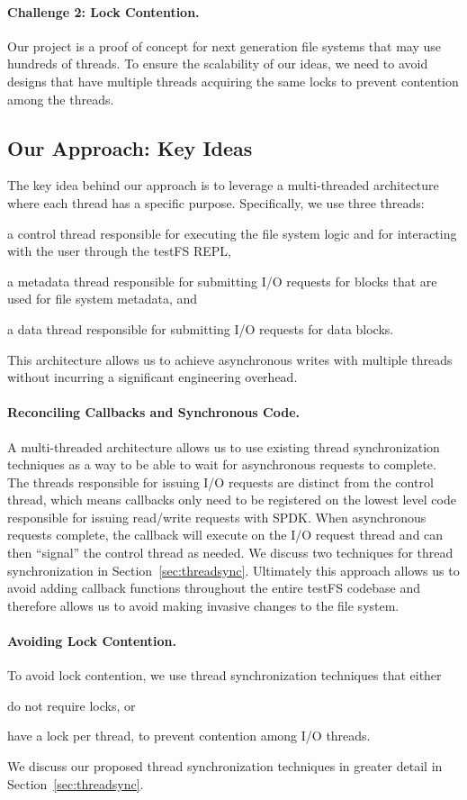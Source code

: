 \paragraph{Challenge 2: Lock Contention.}
Our project is a proof of concept for next generation file systems that may use
hundreds of threads. To ensure the scalability of our ideas, we need to avoid
designs that have multiple threads acquiring the same locks to prevent
contention among the threads.

\subsection{Our Approach: Key Ideas}
The key idea behind our approach is to leverage a multi-threaded architecture
where each thread has a specific purpose. Specifically, we use three threads:
\begin{enumerate*}[label={(\roman*)}]
  \item a control thread responsible for executing the file system logic and
    for interacting with the user through the testFS REPL,
  \item a metadata thread responsible for submitting I/O requests for blocks
    that are used for file system metadata, and
  \item a data thread responsible for submitting I/O requests for data blocks.
\end{enumerate*}
This architecture allows us to achieve asynchronous writes with multiple
threads without incurring a significant engineering overhead.

\paragraph{Reconciling Callbacks and Synchronous Code.}
A multi-threaded architecture allows us to use existing thread synchronization
techniques as a way to be able to wait for asynchronous requests to complete.
The threads responsible for issuing I/O requests are distinct from the control
thread, which means callbacks only need to be registered on the lowest level
code responsible for issuing read/write requests with SPDK. When asynchronous
requests complete, the callback will execute on the I/O request thread and can
then ``signal'' the control thread as needed. We discuss two techniques for
thread synchronization in Section~\ref{sec:threadsync}. Ultimately this
approach allows us to avoid adding callback functions throughout the entire
testFS codebase and therefore allows us to avoid making invasive changes to the
file system.

\paragraph{Avoiding Lock Contention.}
To avoid lock contention, we use thread synchronization techniques that either
\begin{enumerate*}[label={(\roman*)}]
  \item do not require locks, or
  \item have a lock per thread, to prevent contention among I/O threads.
\end{enumerate*}
We discuss our proposed thread synchronization techniques in greater detail in
Section~\ref{sec:threadsync}.
